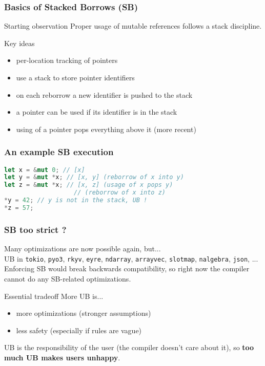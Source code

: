 \begin{frame}
    \frametitle{Basics of Stacked Borrows (SB)}
    \begin{block}{Starting observation}
        Proper usage of mutable references follows a stack discipline.
    \end{block}
    \begin{block}{Key ideas}
        \begin{itemize}
            \item per-location tracking of pointers
            \item use a stack to store pointer identifiers
            \item on each reborrow a new identifier is pushed to the stack
            \item a pointer can be used if its identifier is in the stack
            \item using of a pointer pops everything above it (more recent)
        \end{itemize}
    \end{block}
\end{frame}

\begin{frame}[fragile]
    \frametitle{An example SB execution}
    \begin{block}{}
        \begin{lstlisting}[language=rust]
let x = &mut 0; // [x]
let y = &mut *x; // [x, y] (reborrow of x into y)
let z = &mut *x; // [x, z] (usage of x pops y)
                   // (reborrow of x into z)
*y = 42; // y is not in the stack, UB !
*z = 57;
        \end{lstlisting}
    \end{block}
\end{frame}

\begin{frame}
    \frametitle{SB too strict ?}
    Many optimizations are now possible again, but...~\\

    UB in \texttt{tokio}, \texttt{pyo3}, \texttt{rkyv}, \texttt{eyre},
    \texttt{ndarray}, \texttt{arrayvec}, \texttt{slotmap}, \texttt{nalgebra},
    \texttt{json}, ...~\\
    Enforcing SB would break backwards compatibility, so right now the compiler
    cannot do any SB-related optimizations.

    \begin{block}{Essential tradeoff}
        More UB is...
        \begin{itemize}
            \item more optimizations (stronger assumptions)
            \item less safety (especially if rules are vague)
        \end{itemize}
    \end{block}
    \begin{block}{}
        UB is the responsibility of the user (the compiler doesn't care about it),
        so \textbf{too much UB makes users unhappy}.
    \end{block}
\end{frame}

